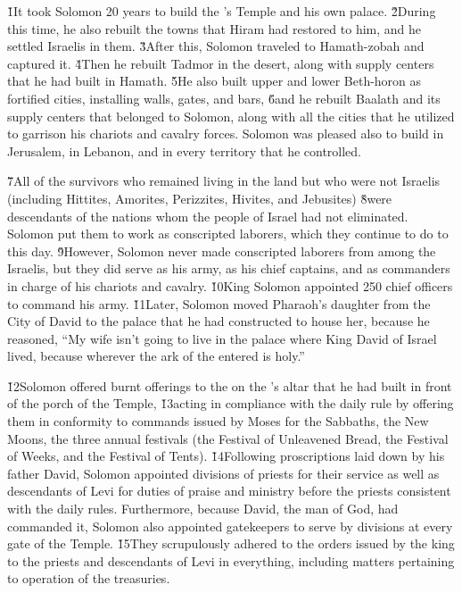 \v{1}It took Solomon 20 years to build the 's Temple and his own palace. \v{2}During this time, he also rebuilt the towns that Hiram had restored to him, and he settled Israelis in them. \v{3}After this, Solomon traveled to Hamath-zobah and captured it. \v{4}Then he rebuilt Tadmor in the desert, along with supply centers that he had built in Hamath. \v{5}He also built upper and lower Beth-horon as fortified cities, installing walls, gates, and bars, \v{6}and he rebuilt Baalath and its supply centers that belonged to Solomon, along with all the cities that he utilized to garrison his chariots and cavalry forces. Solomon was pleased also to build in Jerusalem, in Lebanon, and in every territory that he controlled.

\v{7}All of the survivors who remained living in the land but who were not Israelis (including Hittites, Amorites, Perizzites, Hivites, and Jebusites) \v{8}were descendants of the nations whom the people of Israel had not eliminated. Solomon put them to work as conscripted laborers, which they continue to do to this day. \v{9}However, Solomon never made conscripted laborers from among the Israelis, but they did serve as his army, as his chief captains, and as commanders in charge of his chariots and cavalry. \v{10}King Solomon appointed 250 chief officers to command his army. \v{11}Later, Solomon moved Pharaoh's daughter from the City of David to the palace that he had constructed to house her, because he reasoned, ``My wife isn't going to live in the palace where King David of Israel lived, because wherever the ark of the  entered is holy.''

\v{12}Solomon offered burnt offerings to the  on the 's altar that he had built in front of the porch of the Temple, \v{13}acting in compliance with the daily rule by offering them in conformity to commands issued by Moses for the Sabbaths, the New Moons, the three annual festivals (the Festival of Unleavened Bread, the Festival of Weeks, and the Festival of Tents). \v{14}Following proscriptions laid down by his father David, Solomon appointed divisions of priests for their service as well as descendants of Levi for duties of praise and ministry before the priests consistent with the daily rules. Furthermore, because David, the man of God, had commanded it, Solomon also appointed gatekeepers to serve by divisions at every gate of the Temple. \v{15}They scrupulously adhered to the orders issued by the king to the priests and descendants of Levi in everything, including matters pertaining to operation of the treasuries.

